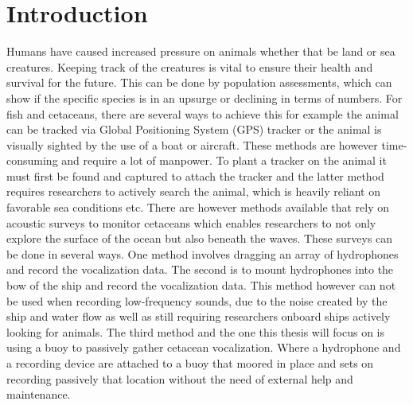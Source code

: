 \chapter{Introduction\label{cha:introduction}}




Humans have caused increased pressure on animals whether that be land or sea creatures.
Keeping track of the creatures is vital to ensure their health and survival for the future.
This can be done by population assessments, which can show if the specific species is in an upsurge or declining in terms of numbers.
For fish and cetaceans, there are several ways to achieve this for example the animal can be tracked via Global Positioning System (GPS) tracker or the animal is visually sighted by the use of a boat or aircraft.
These methods are however time-consuming and require a lot of manpower.
To plant a tracker on the animal it must first be found and captured to attach the tracker and the latter method requires researchers to actively search the animal, which is heavily reliant on favorable sea conditions etc.
There are however methods available that rely on acoustic surveys to monitor cetaceans which enables researchers to not only explore the surface of the ocean but also beneath the waves.
These surveys can be done in several ways.
One method involves dragging an array of hydrophones and record the vocalization data.
The second is to mount hydrophones into the bow of the ship and record the vocalization data.
This method however can not be used when recording low-frequency sounds, due to the noise created by the ship and water flow as well as still requiring researchers onboard ships actively looking for animals.
The third method and the one this thesis will focus on is using a buoy to passively gather cetacean vocalization.
Where a hydrophone and a recording device are attached to a buoy that moored in place and sets on recording passively that location without the need of external help and maintenance.

